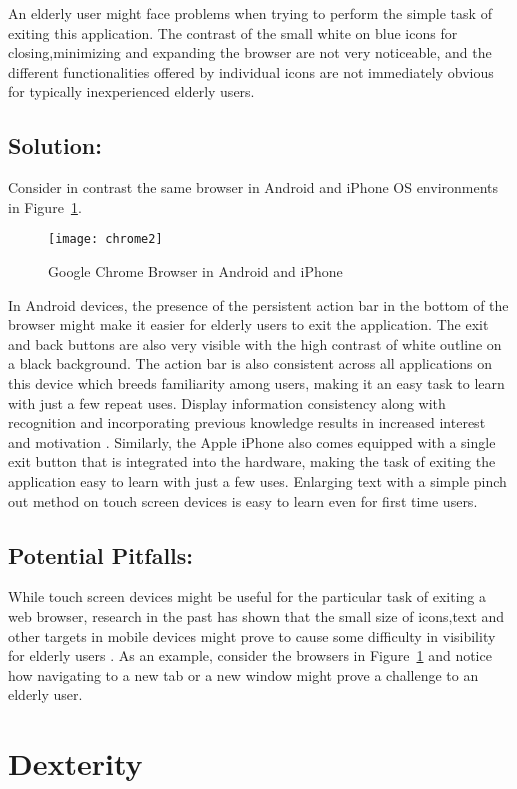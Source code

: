 \documentclass[12pt,draftcls,onecolumn]{IEEEtran}
\begin{document}
An elderly user might face problems when trying to perform the simple task of exiting this application. The contrast of the small white on blue icons for closing,minimizing and expanding the browser are not very noticeable, and the different functionalities offered by individual icons are not immediately obvious for typically inexperienced elderly users. 

\subsection{Solution:}
Consider in contrast the same browser in Android and iPhone OS environments in Figure~\ref{chrome2}.
 \begin{figure}[!h]
\centering
\texttt{[image: chrome2]}
\caption{Google Chrome Browser in Android and iPhone}
\label{chrome2}
\end{figure} 

In Android devices, the presence of the persistent action bar in the bottom of the browser might make it easier for elderly users to exit the application. The exit and back buttons are also very visible with the high contrast of white outline on a black background. The action bar is also consistent across all applications on this device which breeds familiarity among users, making it an easy task to learn with just a few repeat uses. Display information consistency along with recognition and incorporating previous knowledge results in increased interest and motivation \cite{holzinger2007some}. Similarly, the Apple iPhone also comes equipped with a single exit button that is integrated into the hardware, making the task of exiting the application easy to learn with just a few uses.
Enlarging text with a simple pinch out method on touch screen devices is easy to learn even for first time users.  

\subsection{Potential Pitfalls:}
While touch screen devices might be useful for the particular task of exiting a web browser, research in the past has shown that the small size of icons,text and other targets in mobile devices might prove to cause some difficulty in visibility for elderly users \cite{holzinger2007some}. As an example, consider the browsers in Figure~\ref{chrome2} and notice how navigating to a new tab or a new window might prove a challenge to an elderly user. 

\section{Dexterity}
\end{document}
